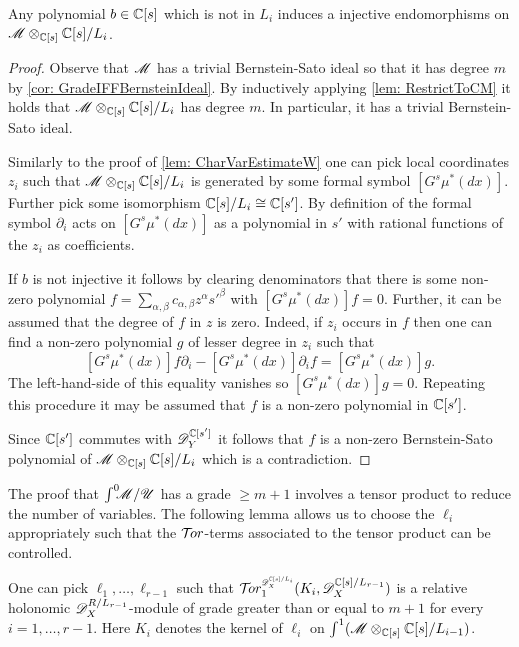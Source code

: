 \begin{lemma}\label{lem: InjectiveEll}
  Any polynomial $b\in \mathbb{C}[s]$ which is not in $L_i$ induces a injective endomorphisms on $\mathscr{M} \otimes_{\mathbb{C}[s]}\mathbb{C}[s]/L_i$.
\end{lemma}
\begin{proof}
  Observe that $\mathscr{M}$ has a trivial Bernstein-Sato ideal so that it has degree $m$ by \cref{cor: GradeIFFBernsteinIdeal}.
  By inductively applying \cref{lem: RestrictToCM} it holds that $\mathscr{M} \otimes_{\mathbb{C}[s]}\mathbb{C}[s]/L_i$ has degree $m$.
  In particular, it has a trivial Bernstein-Sato ideal.

  Similarly to the proof of \cref{lem: CharVarEstimateW} one can pick local coordinates $z_i$ such that $\mathscr{M} \otimes_{\mathbb{C}[s]}\mathbb{C}[s]/L_i$ is generated by some formal symbol $[G^s \mu^*(dx)]$.
  Further pick some isomorphism $\mathbb{C}[s]/L_i \cong \mathbb{C}[s']$.
  By definition of the formal symbol $\partial_i$ acts on $[G^s \mu^*(dx)]$ as a polynomial in $s'$ with rational functions of the $z_i$ as coefficients.

  If $b$ is not injective it follows by clearing denominators that there is some non-zero polynomial $f = \sum_{\alpha,\beta} c_{\alpha,\beta} z^\alpha s'^\beta$ with $[G^s \mu^*(dx)] f = 0$.
  Further, it can be assumed that the degree of $f$ in $z$ is zero.
  Indeed, if $z_i$ occurs in $f$ then one can find a non-zero polynomial $g$ of lesser degree in $z_i$ such that
  $$[G^s \mu^*(dx)] f\partial_i - [G^s \mu^*(dx)]\partial_i f = [G^s \mu^*(dx)] g.$$
  The left-hand-side of this equality vanishes so $[G^s \mu^*(dx)] g = 0$.
  Repeating this procedure it may be assumed that $f$ is a non-zero polynomial in $\mathbb{C}[s']$.

  Since $\mathbb{C}[s']$ commutes with $\mathscr{D}_Y^{\mathbb{C}[s']}$ it follows that $f$ is a non-zero Bernstein-Sato polynomial of $\mathscr{M} \otimes_{\mathbb{C}[s]}\mathbb{C}[s]/L_i$ which is a contradiction.
\end{proof}
The proof that $\int^0 \mkern -8mu\mathscr{M}/\mathscr{U}$ has a grade $\geq m+1$ involves a tensor product to reduce the number of variables.
The following lemma allows us to choose the $\ell_i$ appropriately such that the $\mathcal{T}\mkern -3mu or$-terms associated to the tensor product can be controlled.
\begin{lemma}\label{lem: RelHolTorDegree}
  One can pick $\ell_1,\ldots,\ell_{r-1}$ such that $\Tr{\D_\X^{\C[s]/L_{i}} }{1}(K_i, \D_\X^{\C[s]/L_{r-1}})$ is a relative holonomic $\mathscr{D}_X^{R/L_{r-1}}$-module of grade greater than or equal to $m+1$ for every $i=1,\ldots, r-1$.
  Here $K_i$ denotes the kernel of $\ell_i$ on $\int^1 (\mathscr{M} \otimes_{\mathbb{C}[s]}\mathbb{C}[s]/L_{i-1})$.
\end{lemma}
